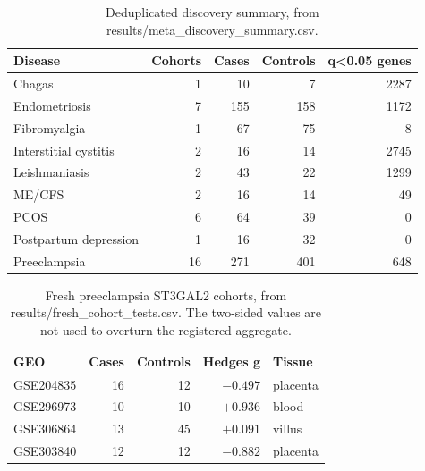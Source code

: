 \begin{table}[ht]\centering\caption{Deduplicated discovery summary, from results/meta\_discovery\_summary.csv.}\begin{tabular}{lrrrr}\hline Disease & Cohorts & Cases & Controls & q<0.05 genes\\\hline
Chagas&1&10&7&2287\\ Endometriosis&7&155&158&1172\\ Fibromyalgia&1&67&75&8\\ Interstitial cystitis&2&16&14&2745\\ Leishmaniasis&2&43&22&1299\\ ME/CFS&2&16&14&49\\ PCOS&6&64&39&0\\ Postpartum depression&1&16&32&0\\ Preeclampsia&16&271&401&648\\\hline\end{tabular}\end{table}
\begin{table}[ht]\centering\caption{Fresh preeclampsia ST3GAL2 cohorts, from results/fresh\_cohort\_tests.csv. The two-sided values are not used to overturn the registered aggregate.}\begin{tabular}{lrrrl}\hline GEO & Cases & Controls & Hedges g & Tissue\\\hline
GSE204835&16&12&$-0.497$&placenta\\ GSE296973&10&10&$+0.936$&blood\\ GSE306864&13&45&$+0.091$&villus\\ GSE303840&12&12&$-0.882$&placenta\\\hline\end{tabular}\end{table}
